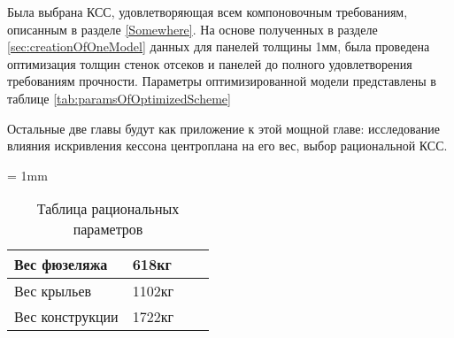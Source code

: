 Была выбрана КСС, удовлетворяющая всем компоновочным требованиям, описанным в разделе \ref{Somewhere}. 
На основе полученных в разделе \ref{sec:creationOfOneModel} данных для панелей толщины 1мм, была проведена оптимизация толщин стенок отсеков и панелей до полного удовлетворения требованиям прочности. Параметры оптимизированной модели представлены в таблице \ref{tab:paramsOfOptimizedScheme}

Остальные две главы будут как приложение к этой мощной главе: исследование влияния искривления кессона центроплана на его вес, выбор рациональной КСС.

\tabulinesep = 1mm
\begin{table}[H]
\captionsetup{justification=centering}
\caption{Таблица рациональных параметров}
\begin{tabu}to 
\hline
Вес фюзеляжа & 618кг & & \\ \hline
Вес крыльев & 1102кг & & \\ \hline
Вес конструкции & 1722кг & & \\ \hline
\end{tabu}
\end{table}
